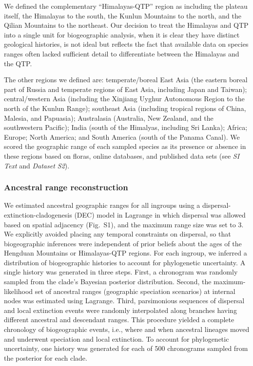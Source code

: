 \documentclass[9pt,twocolumn,twoside,lineno]{pnas-new}
\begin{document}
{We defined the complementary ``Himalayas-QTP'' region as including the
plateau itself, the Himalayas to the south, the Kunlun Mountains to
the north, and the Qilian Mountains to the northeast. Our decision to
treat the Himalayas and QTP into a single unit for biogeographic
analysis, when it is clear they have distinct geological histories, is
not ideal but reflects the fact that available data on species ranges
often lacked sufficient detail to differentiate between the Himalayas
and the QTP.

The other regions we defined are: temperate/boreal East Asia (the
eastern boreal part of Russia and temperate regions of East Asia,
including Japan and Taiwan); central/western Asia (including the
Xinjiang Uyghur Autonomous Region to the north of the Kunlun Range);
southeast Asia (including tropical regions of China, Malesia, and
Papuasia); Australasia (Australia, New Zealand, and the southwestern
Pacific); India (south of the Himalyas, including Sri Lanka); Africa;
Europe; North America; and South America (south of the Panama
Canal). We scored the geographic range of each sampled species as its
presence or absence in these regions based on floras, online
databases, and published data sets (see \textit{SI Text} and
\textit{Dataset S2}).

\subsubsection*{Ancestral range reconstruction}

We estimated ancestral geographic ranges for all ingroups using a
dispersal-extinction-cladogenesis (DEC) model in Lagrange
\citep{Ree2005,Ree2008} in which dispersal was allowed based on
spatial adjacency (Fig.~S1), and the maximum range size was set to
3. We explicitly avoided placing any temporal constraints on
dispersal, so that biogeographic inferences were independent of prior
beliefs about the ages of the Hengduan Mountains or Himalayas-QTP
regions. For each ingroup, we inferred a distribution of biogeographic
histories to account for phylogenetic uncertainty. A single history
was generated in three steps. First, a chronogram was randomly sampled
from the clade's Bayesian posterior distribution. Second, the
maximum-likelihood set of ancestral ranges (geographic speciation
scenarios) at internal nodes was estimated using Lagrange. Third,
parsimonious sequences of dispersal and local extinction events were
randomly interpolated along branches having different ancestral and
descendant ranges. This procedure yielded a complete chronology of
biogeographic events, i.e., where and when ancestral lineages moved
and underwent speciation and local extinction. To account for
phylogenetic uncertainty, one history was generated for each of 500
chronograms sampled from the posterior for each clade.

}
\end{document}
